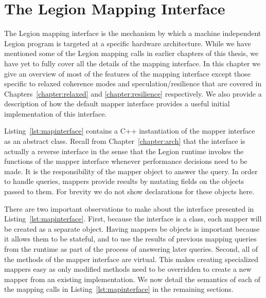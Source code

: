 

\chapter{The Legion Mapping Interface}
\label{chapter:mapping}
The Legion mapping interface is the mechanism by which
a machine independent Legion program is targeted at a 
specific hardware architecture. While we have mentioned 
some of the Legion mapping calls in earlier chapters of this
thesis, we have yet to fully cover all the details of the
mapping interface. In this chapter we give an overview of 
most of the features of the 
mapping interface except those specific to relaxed coherence
modes and speculation/resilience that are covered in 
Chapters~\ref{chapter:relaxed} and \ref{chapter:resilience}
respectively. We also provide a description of how the 
default mapper interface provides a useful initial
implementation of this interface.

Listing~\ref{lst:mapinterface} contains a C++ instantiation
of the mapper interface as an abstract class. Recall from 
Chapter~\ref{chapter:arch} that the interface is actually 
a reverse interface in the sense that the Legion runtime
invokes the functions of the mapper interface whenever
performance decisions need to be made.  It is the 
responsibility of the mapper object to answer the query.
In order to handle queries, mappers provide results by
mutating fields on the objects passed to them. For brevity
we do not show declarations for these objects here.

There are two important observations to make about the
interface presented in Listing~\ref{lst:mapinterface}.
First, because the interface is a class, each mapper
will be created as a separate object. Having mappers be
objects is important because it allows them to be
stateful, and to use the results of previous mapping
queries from the runtime as part of the process of 
answering later queries.  Second, all of the methods
of the mapper interface are virtual. This makes creating
specialized mappers easy as only modified methods need
to be overridden to create a new mapper from an existing 
implementation. We now detail the semantics of each
of the mapping calls in Listing~\ref{lst:mapinterface}
in the remaining sections.

